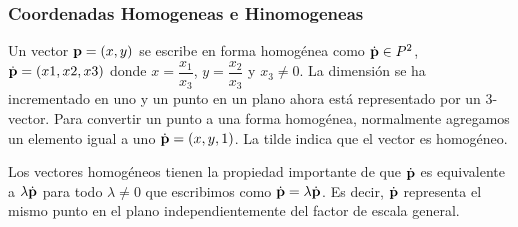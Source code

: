 \begin{frame}
    \frametitle{Coordenadas Homogeneas e Hinomogeneas}
    Un vector $\boldsymbol{\mathbf{p}} = (x, y)$ se escribe en forma homogénea como $\dot{\boldsymbol{\mathbf{p}}} \in P^2$, $\dot{\boldsymbol{\mathbf{p}}} = (x1, x2, x3)$ donde $x = \dfrac{x_1}{x_3}$, $y= \dfrac{x_2}{x_3}$ y $x_3 \neq 0$. La dimensión se ha incrementado en uno y un punto en un plano ahora está representado por un 3-vector. Para convertir un punto a una forma homogénea, normalmente agregamos un elemento igual a uno $\dot{\boldsymbol{\mathbf{p}}} = (x, y, 1)$. La tilde indica que el vector es homogéneo.


    Los vectores homogéneos tienen la propiedad importante de que $\dot{\boldsymbol{\mathbf{p}}}$ es equivalente a $\lambda \dot{\boldsymbol{\mathbf{p}}}$ para todo $\lambda \neq 0$ que escribimos como $\dot{\boldsymbol{\mathbf{p}}} = \lambda \dot{\boldsymbol{\mathbf{p}}}$. Es decir, $\dot{\boldsymbol{\mathbf{p}}}$ representa el mismo punto en el plano independientemente del factor de escala general.
\end{frame}

